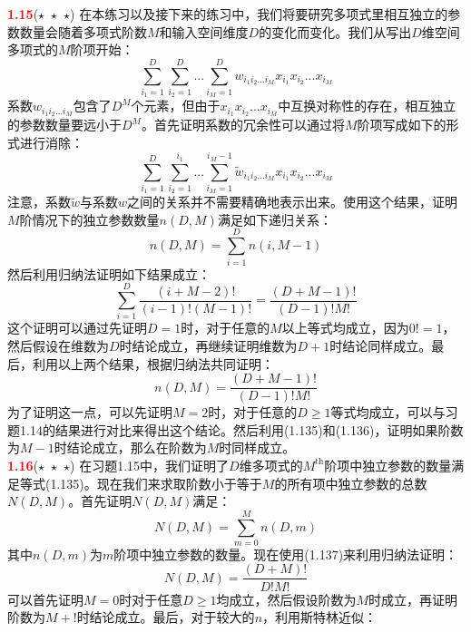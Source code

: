 \documentclass{book}
\numberwithin{equation}{chapter}
\begin{document}
{	\textcolor{red}{\textbf{1.15}}\quad ($\star$\ $\star$\ $\star$) 在本练习以及接下来的练习中，我们将要研究多项式里相互独立的参数数量会随着多项式阶数$M$和输入空间维度$D$的变化而变化。我们从写出$D$维空间多项式的$M$阶项开始：
	\begin{equation}
		\sum_{i_1=1}^D \sum_{i_2=1}^D ... \sum_{i_M=1}^D w_{i_1i_2...i_M}x_{i_1}x_{i_2}...x_{i_M}
	\end{equation}
	系数$w_{i_1i_2...i_M}$包含了$D^M$个元素，但由于$x_{i_1}x_{i_2}...x_{i_M}$中互换对称性的存在，相互独立的参数数量要远小于$D^M$。首先证明系数的冗余性可以通过将$M$阶项写成如下的形式进行消除：
	\begin{equation}
		\sum_{i_1=1}^D\sum_{i_2=1}^{i_1}...\sum_{i_M=1}^{i_M-1}\widetilde{w}_{i_1i_2...i_M}x_{i_1}x_{i_2}...x_{i_M}
	\end{equation}
	注意，系数$\widetilde{w}$与系数$w$之间的关系并不需要精确地表示出来。使用这个结果，证明$M$阶情况下的独立参数数量$n(D,M)$满足如下递归关系：
	\begin{equation}
		n(D,M)=\sum_{i=1}^{D}n(i,M-1)
	\end{equation}
	然后利用归纳法证明如下结果成立：
	\begin{equation}
		\sum_{i=1}^D\frac{(i+M-2)!}{(i-1)!(M-1)!} = \frac{(D+M-1)!}{(D-1)!M!}
	\end{equation}
	这个证明可以通过先证明$D=1$时，对于任意的$M$以上等式均成立，因为$0!=1$，然后假设在维数为$D$时结论成立，再继续证明维数为$D+1$时结论同样成立。最后，利用以上两个结果，根据归纳法共同证明：
	\begin{equation}
		n(D,M)=\frac{(D+M-1)!}{(D-1)!M!}
	\end{equation}
	为了证明这一点，可以先证明$M=2$时，对于任意的$D\geqslant 1$等式均成立，可以与习题1.14的结果进行对比来得出这个结论。然后利用(1.135)和(1.136)，证明如果阶数为$M-1$时结论成立，那么在阶数为$M$时同样成立。\\
	\textcolor{red}{\textbf{1.16}}\quad ($\star$\ $\star$\ $\star$) 在习题1.15中，我们证明了$D$维多项式的$M^{\mathrm{th}}$阶项中独立参数的数量满足等式(1.135)。现在我们来求取阶数小于等于$M$的所有项中独立参数的总数$N(D,M)$。首先证明$N(D,M)$满足：
	\begin{equation}
		N(D,M)=\sum_{m=0}^{M}n(D,m)
	\end{equation}
	其中$n(D,m)$为$m$阶项中独立参数的数量。现在使用(1.137)来利用归纳法证明：
	\begin{equation}
		N(D,M)=\frac{(D+M)!}{D!M!}
	\end{equation}
	可以首先证明$M=0$时对于任意$D\geqslant 1$均成立，然后假设阶数为$M$时成立，再证明阶数为$M+!$时结论成立。最后，对于较大的$n$，利用斯特林近似：
}
\end{document}
